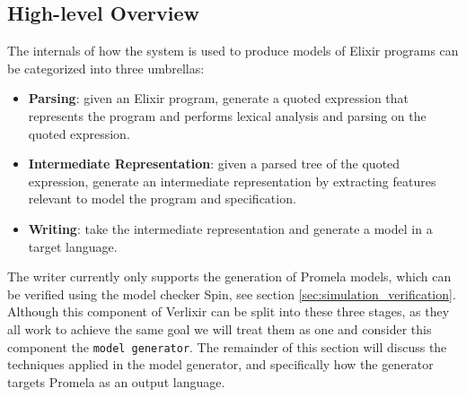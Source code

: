 \subsection{High-level Overview}
The internals of how the system is used to produce models of Elixir programs can be categorized into three umbrellas:
\begin{itemize}
    \item \textbf{Parsing}: given an Elixir program, generate a quoted expression that represents the program and performs lexical analysis and parsing on the quoted expression.
    \item \textbf{Intermediate Representation}: given a parsed tree of the quoted expression, generate an intermediate representation by extracting features relevant to model the program and specification.
    \item \textbf{Writing}: take the intermediate representation and generate a model in a target language.
\end{itemize} 
The writer currently only supports the generation of Promela models, which can be verified using the model checker Spin, see section \ref{sec:simulation_verification}. Although this component of Verlixir can be split into these three stages, as they all work to achieve the same goal we will treat them as one and consider this component the \texttt{model generator}. The remainder of this section will discuss the techniques applied in the model generator, and specifically how the generator targets Promela as an output language.
